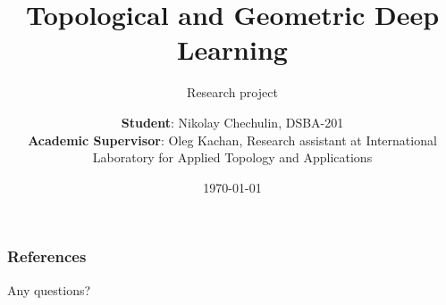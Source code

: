 \documentclass[aspectratio=169]{beamer}
\title{Topological and Geometric Deep Learning}
\subtitle{Research project}
\author{
	\textbf{Student}: Nikolay Chechulin, DSBA-201\\
	\textbf{Academic Supervisor}: Oleg Kachan, Research assistant at International Laboratory for Applied Topology and Applications
}
\date{\today}
\begin{document}
\frame[plain]{\titlepage}




\begin{frame}[allowframebreaks]
	\frametitle{References}
	\nocite{*}
	\printbibliography{}
\end{frame}

\begin{frame}[plain, c]
	\begin{center}
		\Huge Any questions?
	\end{center}
\end{frame}
\end{document}
